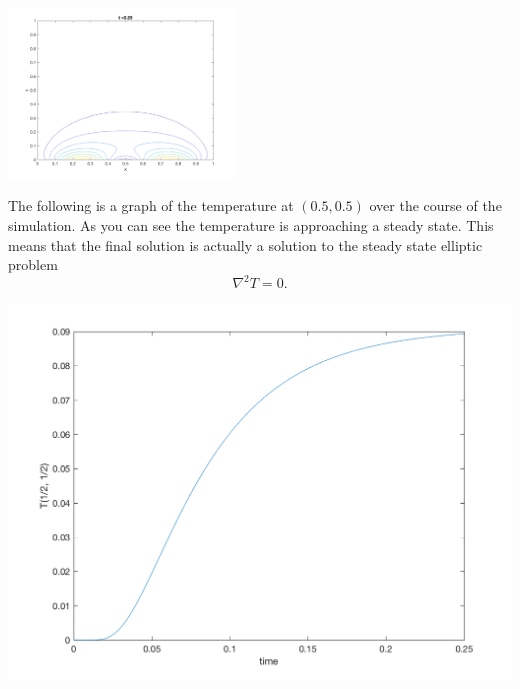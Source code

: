 \documentclass[11pt, oneside]{article}
\begin{document}
\begin{enumerate}
\begin{center}
      \includegraphics[width=0.45\textwidth]{Figures/04_07.png}
    \end{center}
    The following is a graph of the temperature at $(0.5, 0.5)$ over
    the course of the simulation.
    As you can see the temperature is approaching a steady state.
    This means that the final solution is actually a solution to the
    steady state elliptic problem
    \[
      \nabla^2 T = 0.
    \]
    \begin{center}
      \includegraphics[scale=0.5]{Figures/04_08.png}
    \end{center}

\end{enumerate}
\end{document}

